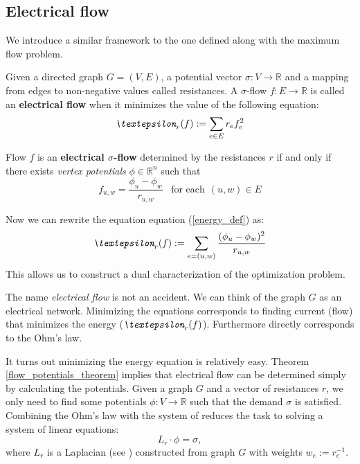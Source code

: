 \subsection{Electrical flow}
We introduce a similar framework to the one defined along with the maximum flow problem.
\begin{definition}
Given a directed graph $G=(V,E)$, a potential vector $\sigma: V\rightarrow \mathbb{R}$ and a mapping from edges to non-negative values called resistances. A $\sigma$-flow $f:E\rightarrow\mathbb{R}$ is called an \textbf{electrical flow} when it minimizes the value of the following equation:
\begin{equation} \label{energy_def}
\emph{\textepsilon}_r(f) := \sum_{e \in E} r_e f_e^2
\end{equation}
\end{definition}

\begin{theorem} \label{flow_potentials_theorem}
Flow $f$ is an \textbf{electrical $\sigma$-flow} determined by the resistances $r$ if and only if there exists \textit{vertex potentials} $\phi \in \mathbb{R}^n$ such that
\begin{equation*}
f_{u,w} = \frac{\phi_u - \phi_w}{r_{u,w}} \hspace{10pt} \text{for each} \hspace{5pt} (u,w) \in E
\end{equation*}
\end{theorem}

Now we can rewrite the equation equation (\ref{energy_def}) as:
\begin{equation} \label{ohm}
\emph{\textepsilon}_r(f) := \sum_{e=(u,w)}\frac{(\phi_u - \phi_w)^2}{r_{u,w}}
\end{equation}
This allows us to construct a dual characterization of the optimization problem.

The name \textit{electrical flow} is not an accident. We can think of the graph $G$ as an electrical network. Minimizing the equations corresponds to finding current (flow) that minimizes the energy ($\emph{\textepsilon}_r(f)$). Furthermore  directly corresponds to the Ohm's law.

It turns out minimizing the energy equation is relatively easy. Theorem \ref{flow_potentials_theorem} implies that electrical flow can be determined simply by calculating the potentials. 
Given a graph $G$ and a vector of resistances $r$, we only need to find some potentials $\phi: V\rightarrow\mathbb{R}$ such that the demand $\sigma$ is satisfied. 
Combining the Ohm's law with the system of  reduces the task to solving a system of linear equations:
\[ L_r \cdot \phi = \sigma, \]
where $L_r$ is a Laplacian (see ) constructed from graph $G$ with weights $w_e:=r_e^{-1}$.

